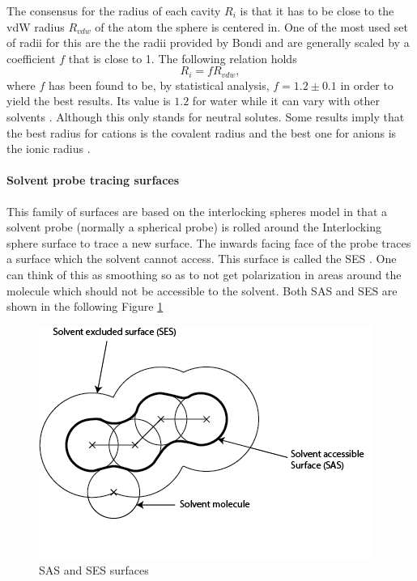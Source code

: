 \documentclass[../Thesis.tex]{subfiles}
\begin{document}
The consensus for the radius of each cavity $R_i$ is that it has to be close to the \ac{vdW} radius
$R_{vdw}$ of the atom the sphere is centered in. One of the most used set of radii for
this are the the radii provided by Bondi \cite{doi:10.1021/j100785a001, Tomasi:2005ipa}
and are generally  scaled by a coefficient $f$ that is close to 1. The following relation holds
\cite{Tomasi:1994wt}
\begin{equation}
  R_i = fR_{vdw},
\end{equation}
where $f$ has been found to be, by statistical analysis, $f = 1.2 \pm 0.1$ in order to
yield the best results. Its value is $1.2$ for water while it can vary with
other solvents \cite{Tomasi:1994wt}. Although this only stands for neutral
solutes. Some results imply that the best radius for cations is the covalent
radius and the best one for anions is the ionic radius \cite{Tomasi:1994wt}.
\paragraph{Solvent probe tracing surfaces}\label{Spts}
This family of surfaces are based on the interlocking spheres model in that a
solvent probe (normally a spherical probe) is rolled around the Interlocking
sphere surface to trace a new surface. The inwards facing face of the probe traces a surface
which the solvent cannot access. This surface is called the \ac{SES}
\cite{Tomasi:2005ipa, Mennucci:2018}.  One can think of this as
smoothing so as to not get polarization in areas around the molecule which should
not be accessible to the solvent. Both SAS and \ac{SES} are shown in the following
Figure \ref{fig:SASSEShomemade}
\begin{figure}[ht]
  \includegraphics[width=\linewidth]{img/SASSES.png}
  \caption{SAS and SES surfaces}
  \label{fig:SASSEShomemade}
\end{figure}
\end{document}

